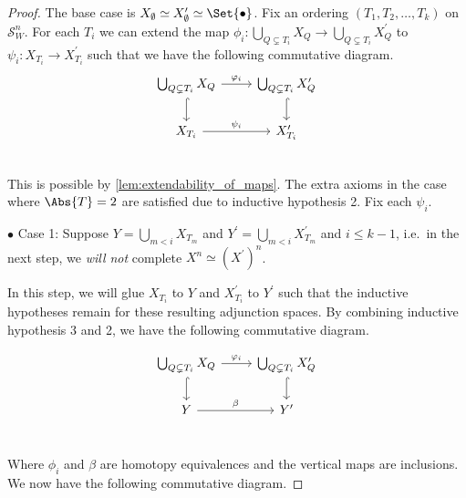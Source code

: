 \documentclass[class=article, crop=false]{standalone}
\begin{document}
\begin{proof}
    The base case is $X_\emptyset \simeq X^\prime_\emptyset \simeq \Set{\bullet}$.
    Fix an ordering $(T_1, T_2, \ldots , T_k)$ on $\mathcal{S}^n_W$.
    For each $T_i$ we can extend the map $\phi_i \colon \bigcup_{Q \subsetneq T_i} X_{Q} \to \bigcup_{Q \subsetneq T_i} X^\prime_{Q}$ to $\psi_i \colon X_{T_i} \to X^\prime_{T_i}$ such that we have the following commutative diagram.
    \vspace{0.2cm}
    \begin{equation*}
        \begin{tikzcd}
\bigcup_{Q \subsetneq T_i} X_{Q}  \ar[r, "\phi_i"]             &   \bigcup_{Q \subsetneq T_i} X^\prime_{Q}                                  \\
X_{T_i} \ar[r, "\psi_i" ] \ar[from = u, hookrightarrow]                                  &   X^\prime_{T_i}  \ar[from = u, hookrightarrow]      \\
        \end{tikzcd}
    \end{equation*}
    \vspace{-0.2cm}
    This is possible by \cref{lem:extendability_of_maps}. The extra axioms in the case where $\Abs{T}=2$ are satisfied due to inductive hypothesis 2. Fix each $\psi_i$.

    $\bullet$ Case 1: Suppose $Y = \bigcup_{m < i} X_{T_m}$ and $Y^\prime = \bigcup_{m < i} X^\prime_{T_m}$ and $i\leq k-1$, i.e.~in the next step, we \emph{will not} complete $X^n \simeq (X^\prime)^n$.

    In this step, we will glue $X_{T_{i}}$ to $Y$ and $X^\prime_{T_{i}}$ to $Y^\prime$ such that the inductive hypotheses remain for these resulting adjunction spaces.
    By combining inductive hypothesis 3 and 2, we have the following commutative diagram.

    \begin{equation*}
        \begin{tikzcd}
\bigcup_{Q \subsetneq T_i} X_{Q} \ar[r, "\phi_i" ] \ar[d, hookrightarrow]     &   \bigcup_{Q \subsetneq T_i} X^\prime_{Q}  \ar[d, hookrightarrow]       \\
Y  \ar[r, "\beta"]                                                                 &   Y^\prime                                                  \\
        \end{tikzcd}
        \label{eqn:commutative_Y_inductive_hyp}  
    \end{equation*}

    Where $\phi_i$ and $\beta$ are homotopy equivalences and the vertical maps are inclusions. We now have the following commutative diagram.


\end{proof}
\end{document}
